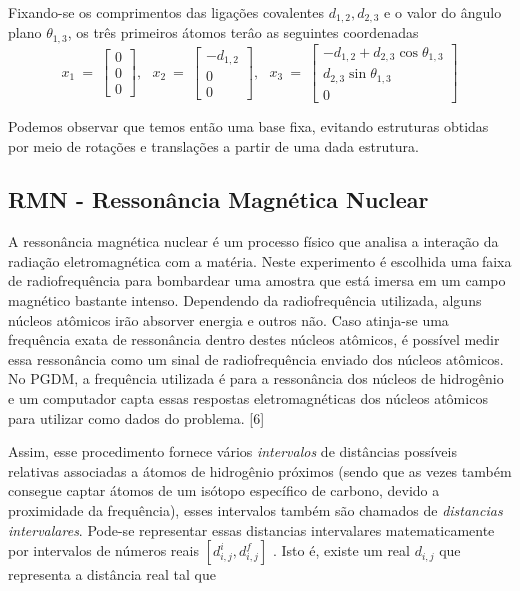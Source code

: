\documentclass[a4paper,12pt]{article}
\begin{document}
	Fixando-se os comprimentos das ligações covalentes $d_{1,2},d_{2,3}$ e o valor do ângulo plano $\theta_{1,3}$, os três primeiros átomos terâo as seguintes coordenadas
	$$
	x_1\:=\:
	\begin{bmatrix}
	0\\ 
	0\\  
	0
	\end{bmatrix},\:\:\:
	x_2\:=\:
	\begin{bmatrix}
	-d_{1,2}\\ 
	0\\  
	0
	\end{bmatrix},\:\:\:
	x_3\:=\:
	\begin{bmatrix}
	-d_{1,2}+d_{2,3}\cos\theta_{1,3}\\ 
	d_{2,3}\sin\theta_{1,3}\\  
	0
	\end{bmatrix}
	$$
	
	Podemos observar que temos então uma base fixa, evitando estruturas obtidas por meio de rotações e translações a partir de uma dada estrutura.
	
	
	\subsection{RMN - Ressonância Magnética Nuclear}
	A ressonância magnética nuclear é um processo físico que analisa a interação da radiação eletromagnética com a matéria. Neste experimento é escolhida uma faixa de radiofrequência para bombardear uma amostra que está imersa em um campo magnético bastante intenso. Dependendo da radiofrequência utilizada, alguns núcleos atômicos irão absorver energia e outros não. Caso atinja-se uma frequência exata de ressonância dentro destes núcleos atômicos, é possível medir essa ressonância como um sinal de radiofrequência enviado dos núcleos atômicos. No PGDM, a frequência utilizada é para a ressonância dos núcleos de hidrogênio e um computador capta essas respostas eletromagnéticas dos núcleos atômicos para utilizar como dados do problema. [6]
	
	Assim, esse procedimento fornece vários \textit{intervalos} de distâncias possíveis relativas associadas a átomos de hidrogênio próximos (sendo que as vezes também consegue captar átomos de um isótopo específico de carbono, devido a proximidade da frequência), esses intervalos também são chamados de \textit{distancias intervalares}. Pode-se representar essas distancias intervalares matematicamente por intervalos de números reais $[d_{i,j}^i, d_{i,j}^f]$ . Isto é, existe um real $d_{i,j}$ que representa a distância real tal que
	
\end{document}
